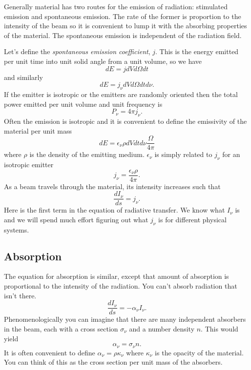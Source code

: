 Generally material has two routes for the emission of radiation:
stimulated emission and spontaneous emission.  The rate of the former
is proportion to the intensity of the beam so it is convenient to lump
it with the absorbing properties of the material.   The spontaneous
emission is independent of the radiation field.

Let's define the {\em spontaneous emission coefficient}, $j$.  This is
the energy emitted per unit time into unit solid angle from a unit
volume, so we have
\begin{equation}
d E = j dV d\Omega dt
\label{eq:48}
\end{equation}
and similarly
\begin{equation}
d E = j_\nu dV d\Omega dt d\nu.
\label{eq:49}
\end{equation}
If the emitter is isotropic or the emitters are randomly oriented then
the total power emitted per unit volume and unit frequency is
\begin{equation}
P_\nu = 4\pi j_\nu.
\label{eq:50}
\end{equation}
Often the emission is isotropic and it is convenient to define the
emissivity of the material per unit mass
\begin{equation}
dE = \epsilon_\nu \rho dV dt d\nu \frac{\Omega}{4\pi}
\label{eq:51}
\end{equation}
where $\rho$ is the density of the emitting medium.  $\epsilon_\nu$ is
simply related to $j_\nu$ for an isotropic emitter
\begin{equation}
j_\nu = \frac{\epsilon_\nu \rho}{4\pi}.
\label{eq:52}
\end{equation}
As a beam travels through the material, its intensity increases such
that
\begin{equation}
\frac{d I_\nu}{ds} = j_\nu.
\label{eq:53}
\end{equation}
Here is the first term in the equation of radiative transfer.  We know
what $I_\nu$ is and we will spend much effort figuring out what
$j_\nu$ is for different physical systems.

\subsection{Absorption}
\label{sec:absorption}

The equation for absorption is similar, except that amount of
absorption is proportional to the intensity of the radiation.  You
can't absorb radiation that isn't there.
\begin{equation}
\frac{d I_\nu}{ds} = -\alpha_\nu I_\nu.
\label{eq:54}
\end{equation}
Phenomenologically you can imagine that there are many independent
absorbers in the beam, each with a cross section $\sigma_\nu$ and a
number density $n$.  This would yield 
\begin{equation}
\alpha_\nu = \sigma_\nu n.
\label{eq:55}
\end{equation}
It is often convenient to define $\alpha_\nu = \rho \kappa_\nu$ where
$\kappa_\nu$ is the opacity of the material.  You can think of this as
the cross section per unit mass of the absorbers.

